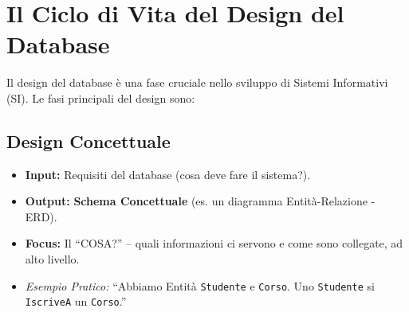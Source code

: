 	\section{Il Ciclo di Vita del Design del Database}
	
	Il design del database è una fase cruciale nello sviluppo di Sistemi Informativi (SI). Le fasi principali del design sono:
	
	\subsection{Design Concettuale}
	\begin{itemize}
		\item \textbf{Input:} Requisiti del database (cosa deve fare il sistema?).
		\item \textbf{Output:} \textbf{Schema Concettuale} (es. un diagramma Entità-Relazione - ERD).
		\item \textbf{Focus:} Il ``COSA?'' – quali informazioni ci servono e come sono collegate, ad alto livello.
		\item \textit{Esempio Pratico:} ``Abbiamo Entità \texttt{Studente} e \texttt{Corso}. Uno \texttt{Studente} si \texttt{IscriveA} un \texttt{Corso}.''
	\end{itemize}
	
		
